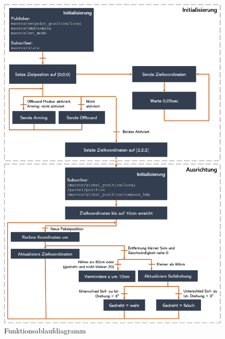 \begin{figure}[h]
	\centering
	\includegraphics[scale=0.5]{"Grafiken/Prozellablauf.png"}
	\caption{Funktionsablaufdiagramm}
	\label{fig:Programmablauf}
\end{figure}